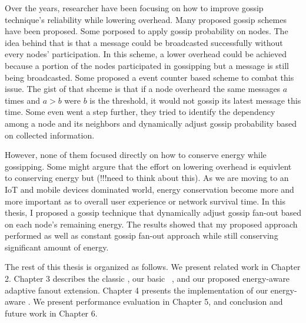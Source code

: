 Over the years, researcher have been focusing on how to improve gossip technique's reliability while lowering overhead. Many proposed gossip schemes have been proposed. Some porposed to apply gossip probability on nodes. The idea behind that is that a message could be broadcasted successfully without every nodes' participation. In this scheme, a lower overhead could be achieved because a portion of the nodes participated in gossipping but a message is still being broadcasted. Some proposed a event counter based scheme to combat this issue. The gist of that shceme is that if a node overheard the same messages $a$ times and $a > b$ were $b$ is the threshold, it would not gossip its latest message this time. Some even went a step further, they tried to identify the dependency among a node and its neighbors and dynamically adjust gossip probability based on collected information.

However, none of them focused directly on how to conserve energy while gossipping. Some might argure that the effort on lowering overhead is equivlent to conserving energy but (!!!need to think about this). As we are moving to an IoT and mobile devices dominated world, energy conservation become more and more important as to overall user experience or network survival time. In this thesis, I proposed a gossip technique that dynamically adjust gossip fan-out based on each node's remaining energy. The results showed that my proposed approach performed as well as constant gossip fan-out approach while still conserving significant amount of energy.

The rest of this thesis is organized as follows. We present related work in Chapter 2. Chapter 3 describes the classic \gp, our basic \pp ~\gp, and our proposed energy-aware adaptive fanout extension. Chapter 4 presents the implementation of our energy-aware \gp. We present performance evaluation in Chapter 5, and conclusion and future work in Chapter 6.






